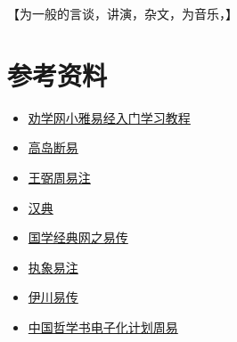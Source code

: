 \documentclass[12pt,oneside]{book}
\begin{document}
【为一般的言谈，讲演，杂文，为音乐，】


\chapter{参考资料}
\begin{itemize}
\item \href{http://www.quanxue.cn/QT_XiaoYa/YiJingIndex.html}{劝学网小雅易经入门学习教程}
\item \href{http://www.xshiqi.com/category_zyzs/dgzs/gddy}{高岛断易}
\item \href{http://www.quanxue.cn/QT_MingXiang/ZhouYiZhuIndex.html}{王弼周易注}
\item \href{https://www.zdic.net/}{汉典}
\item \href{http://vsucai.cn/yizhuan/index.html}{国学经典网之易传}
\item \href{http://www.xshiqi.com/category_zyzs/dgzs/zxyz/}{执象易注}
\item \href{https://www.eee-learning.com/article/897}{伊川易传}
\item \href{https://ctext.org/book-of-changes/zhs}{中国哲学书电子化计划周易}
\end{itemize}








\end{document}
